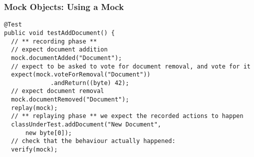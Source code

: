 \documentclass{beamer}
\newenvironment{changemargin}[1]{%
  \begin{list}{}{%
    \setlength{\topsep}{0pt}%
    \setlength{\leftmargin}{#1}%
    \setlength{\rightmargin}{1em}
    \setlength{\listparindent}{\parindent}%
    \setlength{\itemindent}{\parindent}%
    \setlength{\parsep}{\parskip}%
  }%
  \item[]}{\end{list}}
\begin{document}
\begin{frame}[fragile]
  \frametitle{Mock Objects: Using a Mock}
  \begin{changemargin}{1cm}
{\small
  \begin{lstlisting}
@Test
public void testAddDocument() {
  // ** recording phase **
  // expect document addition
  mock.documentAdded("Document");
  // expect to be asked to vote for document removal, and vote for it
  expect(mock.voteForRemoval("Document"))
             .andReturn((byte) 42);
  // expect document removal
  mock.documentRemoved("Document");
  replay(mock);
  // ** replaying phase ** we expect the recorded actions to happen
  classUnderTest.addDocument("New Document",
      new byte[0]);
  // check that the behaviour actually happened:
  verify(mock);
  \end{lstlisting}
}
  \end{changemargin}
\end{frame}
\end{document}
